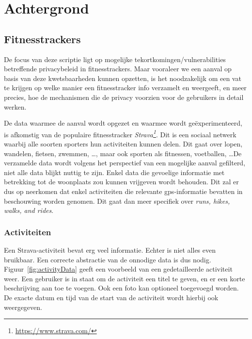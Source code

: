 
\chapter{Achtergrond}

\section{Fitnesstrackers}
De focus van deze scriptie ligt op mogelijke tekortkomingen/vulnerabilities
betreffende privacybeleid in fitnesstrackers. Maar vooraleer we een aanval op
basis van deze kwetsbaarheden kunnen opzetten, is het noodzakelijk om een vat
te krijgen op welke manier een fitnesstracker info verzamelt en weergeeft, en
meer precies, hoe de mechanismen die de privacy voorzien voor de gebruikers in
detail werken.

De data waarmee de aanval wordt opgezet en waarmee wordt geëxperimenteerd, is
afkomstig van de populaire fitnesstracker
\textit{Strava\footnote{\url{https://www.strava.com/}}}. Dit is een sociaal
netwerk waarbij alle soorten sporters hun activiteiten kunnen delen. Dit gaat
over lopen, wandelen, fietsen, zwemmen, \ldots, maar ook sporten als fitnessen,
voetballen, \ldots De verzamelde data wordt volgens het perspectief van een
mogelijke aanval gefilterd, niet alle data blijkt nuttig te zijn. Enkel data
die gevoelige informatie met betrekking tot de woonplaats zou kunnen vrijgeven
wordt behouden. Dit zal er dus op neerkomen dat enkel activiteiten die
relevante \ac{gps}-informatie bevatten in beschouwing worden genomen. Dit gaat
dan meer specifiek over \textit{runs, hikes, walks, and rides}.

\subsection{Activiteiten}\label{data}
Een Strava-activiteit bevat erg veel informatie. Echter is niet alles even
bruikbaar. Een correcte abstractie van de onnodige data is dus nodig.
Figuur~\ref{fig:activityData} geeft een voorbeeld van een gedetailleerde
activiteit weer. Een gebruiker is in staat om de activiteit een titel te geven,
en er een korte beschrijving aan toe te voegen. Ook een foto kan optioneel
toegevoegd worden. De exacte datum en tijd van de start van de activiteit wordt
hierbij ook weergegeven.

